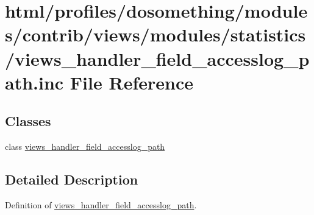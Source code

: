 \hypertarget{views__handler__field__accesslog__path_8inc}{
\section{html/profiles/dosomething/modules/contrib/views/modules/statistics/views\_\-handler\_\-field\_\-accesslog\_\-path.inc File Reference}
\label{views__handler__field__accesslog__path_8inc}
}
\subsection*{Classes}
\begin{DoxyCompactItemize}
\item 
class \hyperlink{classviews__handler__field__accesslog__path}{views\_\-handler\_\-field\_\-accesslog\_\-path}
\end{DoxyCompactItemize}


\subsection{Detailed Description}
Definition of \hyperlink{classviews__handler__field__accesslog__path}{views\_\-handler\_\-field\_\-accesslog\_\-path}. 